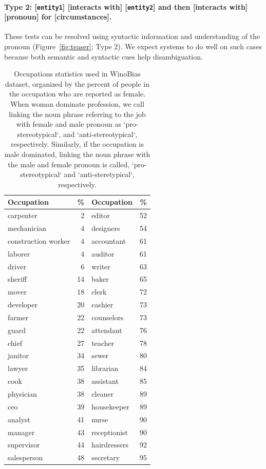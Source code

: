 \paragraph{Type 2: [\texttt{entity1}] [interacts with]  [\texttt{entity2}] and then [interacts with] [pronoun] for [circumstances].} These tests can be resolved using syntactic information and understanding of the pronoun (Figure~\ref{fig:teaser}; Type 2). 
We expect systems to do well on such cases because both semantic and syntactic cues help disambiguation.

\begin{table}[t]
    \small
    \centering
    \begin{tabular}{|l|r|l|r|}
    \hline
    Occupation & \% & Occupation & \% \\
    \hline

carpenter &2 &  editor  &52  \\ 
mechanician &  4 & designers &54  \\
construction worker & 4 &  accountant  &61  \\ 
laborer & 4  & auditor &   61  \\
driver  & 6 & writer  &63  \\  
sheriff &14 & baker &65  \\ 
mover & 18   & clerk &72  \\ 
developer &20 &   cashier & 73  \\  
farmer  &22 &   counselors  &73  \\  
guard &22 &    attendant &  76  \\
chief & 27   & teacher & 78  \\ 
janitor & 34    &  sewer &80  \\
lawyer  &35 &     librarian &84  \\
cook &  38   & assistant & 85  \\
physician&  38 &   cleaner & 89  \\ 
ceo &39 &    housekeeper &89  \\
analyst &41 &    nurse & 90  \\
manager &43 &    receptionist  &90  \\
supervisor & 44   &  hairdressers  &92  \\
salesperson&  48 &   secretary & 95  \\
\hline
    \end{tabular}
    \caption{\small Occupations statistics used in WinoBias dataset, organized by the percent of people in the occupation who are reported as female. When woman dominate profession, we call linking the noun phrase referring to the job with female and male pronoun as `pro-stereotypical`, and `anti-stereotypical`, respectively. Similarly, if the occupation is male dominated, linking the noun phrase with the male and female pronoun is called, `pro-stereotypical` and `anti-steretypical`, respectively.}
    \label{tab:gender_table}
\end{table}
